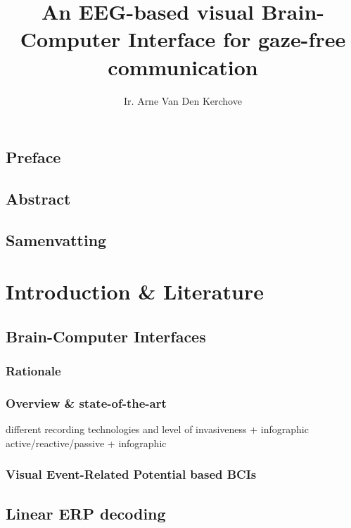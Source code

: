 \documentclass[draft]{book}
\title{\sffamily An EEG-based visual Brain-Computer Interface for gaze-free communication}
\author{Ir. Arne Van Den Kerchove}
\begin{document}
\pagestyle{front}
\frontmatter

\chapter{Preface}
\lipsum[1]
\chapter{Abstract}
\lipsum[2-4]
\chapter{Samenvatting}
\lipsum[5-7]
\tableofcontents
\listoffigures
\listoftables



\mainmatter
\pagestyle{main}


\part{Introduction \& Literature}

\chapter{Brain-Computer Interfaces}
\begin{refsection}
\section{Rationale}
\section{Overview \& state-of-the-art}
different recording technologies and level of invasiveness + infographic
active/reactive/passive + infographic
\section{Visual Event-Related Potential based BCIs}
\printbibliography[heading=subbibliography]
\end{refsection}

\chapter{Linear ERP decoding}
\end{document}
